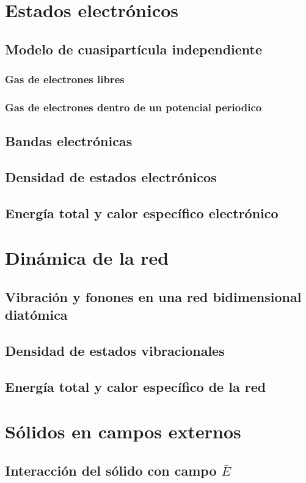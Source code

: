 \documentclass[]{article}
\begin{document}
\section{Estados electrónicos}
\subsection{Modelo de cuasipartícula independiente}
\subsubsection{Gas de electrones libres}
\subsubsection{Gas de electrones dentro de un potencial periodico}
\subsection{Bandas electrónicas}
\subsection{Densidad de estados electrónicos}
\subsection{Energía total y calor específico electrónico}

\section{Dinámica de la red}
\subsection{Vibración y fonones en una red bidimensional diatómica}
\subsection{Densidad de estados vibracionales}
\subsection{Energía total y calor específico de la red}

\section{Sólidos en campos externos}
\subsection{Interacción del sólido con campo $\bar{E}$}
\end{document}
